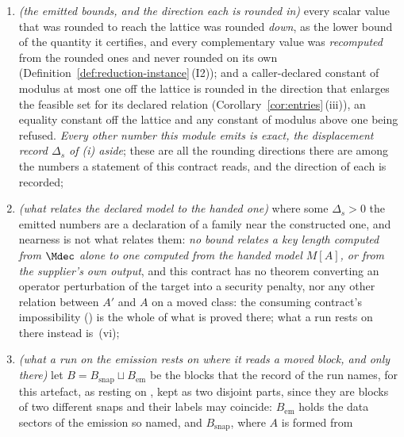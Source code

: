 \begin{theorem}
\begin{enumerate}[label=(\roman*),leftmargin=3.0em]
  \eqref{eq:instance-classmarginal} where the instance discharges it --- and
  Theorem~\ref{thm:transfer} and Theorem~\ref{thm:chain} hold of the one-link
   (Definition~\ref{def:link}) whose
   is $(\Bsys,\Mdec)$, whose target is $(\Qsys,F)$ and
  whose  is $\Lambda$, with
  $\textsf{status}=\textsf{exact}$;
\item \emph{(the emitted bounds, and the direction each is rounded in)} every
  scalar value that was rounded to reach the lattice was rounded
  \emph{down}, as the lower bound of the quantity it certifies, and every
  complementary value was \emph{recomputed} from the rounded ones and never
  rounded on its own (Definition~\ref{def:reduction-instance}\,(I2)); and a
  caller-declared constant of modulus at most one off the lattice is rounded
  in the direction that enlarges the feasible set for its declared relation
  (Corollary~\ref{cor:entries}\,(iii)), an equality constant off the lattice
  and any constant of modulus above one being refused. \emph{Every other
  number this module emits is exact, the displacement record $\Delta_s$ of
  (i) aside}; these are all the rounding directions there are among the
  numbers a statement of this contract reads, and the direction of each is
  recorded;
\item \emph{(what relates the declared model to the handed one)} where some
  $\Delta_s>0$ the emitted numbers are a declaration of a family near the
  constructed one, and nearness is not what relates them: \emph{no bound
  relates a key length computed from $\Mdec$ alone to one computed from the
  handed model $M[A]$, or from the supplier's own output}, and this contract
  has no theorem converting an operator perturbation of the target into a
  security penalty, nor any other relation between $A'$ and $A$ on a moved
  class: the consuming contract's impossibility
  () is the whole of what is proved
  there; what a run rests on there instead is~(vi);
\item \emph{(what a run on the emission rests on where it reads a moved
  block, and only there)} let $B=B_{\mathrm{snap}}\sqcup B_{\mathrm{em}}$
  be the blocks that the record of the run names, for this artefact, as
  resting on , kept as two
  disjoint parts, since they are blocks of two different snaps and their
  labels may coincide: $B_{\mathrm{em}}$ holds the data sectors of the
  emission so named, and $B_{\mathrm{snap}}$, where $A$ is formed from

\end{enumerate}
\end{theorem}

